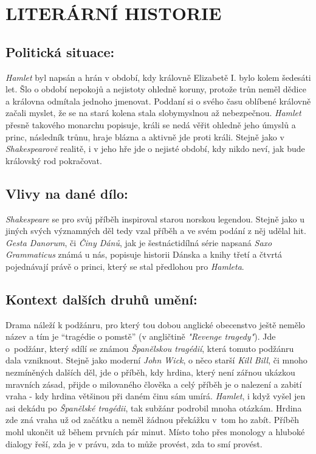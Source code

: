 \documentclass{extarticle} %
\begin{document}
\section*{LITERÁRNÍ HISTORIE}

\subsection*{Politická situace:}
\noindent
\textit{Hamlet} byl napsán a hrán v období, kdy královně Elizabetě I. bylo kolem šedesáti let.
Šlo o období nepokojů a nejistoty ohledně koruny, protože trůn neměl dědice a královna odmítala jednoho jmenovat.
Poddaní si o svého času oblíbené královně začali myslet, že se na stará kolena stala slobymyslnou až nebezpečnou.
\textit{Hamlet} přesně takového monarchu popisuje, králi se nedá věřit ohledně jeho úmyslů a princ, následník trůnu, hraje blázna a aktivně jde proti králi.
Stejně jako v \textit{Shakespearově} realitě, i v jeho hře jde o nejisté období, kdy nikdo neví, jak bude královský rod pokračovat.

\subsection*{Vlivy na dané dílo:}
\noindent
\textit{Shakespeare} se pro svůj příběh inspiroval starou norskou legendou.
Stejně jako u jiných svých významných děl tedy vzal příběh a ve svém podání z něj udělal hit.
\textit{Gesta Danorum}, či \textit{Činy Dánů}, jak je šestnáctidílná série napsaná \textit{Saxo Grammaticus} známá u nás, popisuje historii Dánska a knihy třetí a čtvrtá pojednávají právě o princi, který se stal předlohou pro \textit{Hamleta}.

\subsection*{Kontext dalších druhů umění:}
\noindent
Drama náleží k podžánru, pro který tou dobou anglické obecenstvo ještě nemělo název a tím je \enquote{tragédie o pomstě} (v angličtině \textit{"Revenge tragedy"}).
Jde o~podžánr, který sdílí se známou \textit{Španělskou tragédií}, která tomuto podžánru dala vzniknout.
Stejně jako moderní \textit{John Wick}, o něco starší \textit{Kill Bill}, či mnoho nezmíněných dalších děl, jde o příběh, kdy hrdina, který není zářnou ukázkou mravních zásad, přijde o milovaného člověka a celý příběh je o nalezení a zabití vraha - kdy hrdina většinou při daném činu sám umírá.
\textit{Hamlet}, i když vyšel jen asi dekádu po \textit{Španělské tragédii}, tak subžánr podrobil mnoha otázkám.
Hrdina zde zná vraha už od začátku a neměl žádnou překážku v~tom ho zabít.
Příběh mohl ukončit už během prvních pár minut.
Místo toho přes monology a hluboké dialogy řeší, zda je v právu, zda to může provést, zda to smí provést.
\end{document}
